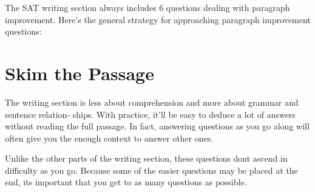 The SAT writing section always includes 6 questions dealing with paragraph improvement. Here's
the general strategy for approaching paragraph improvement questions:

\section{Skim the Passage}
The writing section is less about comprehension and more about grammar and sentence relation-
ships. With practice, it'll be easy to deduce a lot of answers without reading the full passage. In
fact, answering questions as you go along will often give you the enough context to answer other
ones.

\bigskip
Unlike the other parts of the writing section, these questions dont ascend in difficulty as you go.
Because some of the easier questions may be placed at the end, its important that you get to as
many questions as possible.